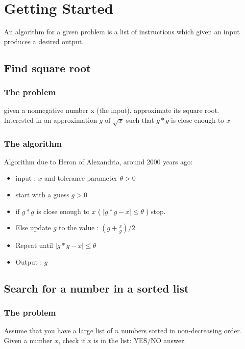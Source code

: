 \documentclass[12pt,oneside]{book}
\begin{document}


\chapter{Getting Started}
An algorithm for a given problem is a list of instructions which given an input produces a desired output.
\section{Find square root }
\subsection{The problem }
given a nonnegative number x (the input), approximate its square root.\\
Interested in an approximation $g$ of $\sqrt{x}$ such that $g*g$ is close enough to $x$
\subsection{The algorithm}
Algorithm due to Heron of Alexandria, around 2000 years ago:
\begin{itemize}
	\item input : $x$ and tolerance parameter $\theta >0$
	\item start with a guess $g>0$
	\item if $g*g$ is close enough to $x$ ( $|g*g-x|\leq \theta$ ) stop.
	\item Else update $g$ to the value : $(g+\frac{x}{g})/2$
	\item Repeat until $|g*g - x| \leq \theta$
	\item Output : $g$
\end{itemize}
\pagebreak
\section{Search for a number in a sorted list }
\subsection{The problem}
Assume that you have a large list of $n$ numbers sorted  in non-decreasing order.\\
Given a number $x$, check if $x$ is in the list: YES/NO answer.
\end{document}

